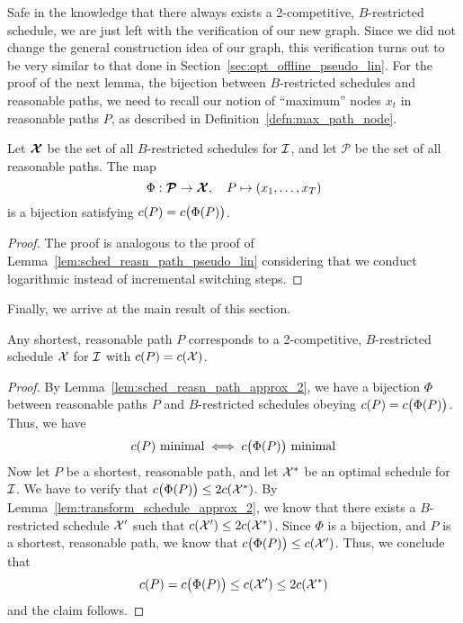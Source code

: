 Safe in the knowledge that there always exists a 2-competitive, $B$-restricted schedule, we are just left with the verification of our new graph. Since we did not change the general construction idea of our graph, this verification turns out to be very similar to that done in Section~\ref{sec:opt_offline_pseudo_lin}. For the proof of the next lemma, the bijection between $B$-restricted schedules and reasonable paths, we need to recall our notion of ``maximum'' nodes $x_t$ in reasonable paths $P$, as described in Definition~\ref{defn:max_path_node}.
\begin{lem}\label{lem:sched_reasn_path_approx_2}
Let $\bm{\mathcal{X}}$ be the set of all $B$-restricted schedules for $\mathcal{I}$, and let $\bm{\mathcal{P}}$ be the set of all reasonable paths. The map
\begin{equation*}
	\Phi:\bm{\mathcal{P}}\rightarrow\bm{\mathcal{X}},\quad P\mapsto (x_1,\dotsc,x_T)
\end{equation*}
is a bijection satisfying $c(P)=c\bigl(\Phi(P)\bigr)$.
\end{lem}
\begin{proof}
The proof is analogous to the proof of Lemma~\ref{lem:sched_reasn_path_pseudo_lin} considering that we conduct logarithmic instead of incremental switching steps.
\end{proof}
Finally, we arrive at the main result of this section.
\begin{thm}\label{thm:approx_2}
Any shortest, reasonable path $P$ corresponds to a 2-competitive, $B$-restricted schedule $\mathcal{X}$ for $\mathcal{I}$ with $c(P)=c(\mathcal{X})$.
\end{thm} 
\begin{proof}
By Lemma~\ref{lem:sched_reasn_path_approx_2}, we have a bijection $\Phi$ between reasonable paths $P$ and $B$-restricted schedules obeying $c(P)=c\bigl(\Phi(P)\bigr)$. Thus, we have 
\begin{equation*}
	c(P)\text{ minimal}\iff c\bigl(\Phi(P)\big)\text{ minimal}
\end{equation*}
Now let $P$ be a shortest, reasonable path, and let $\mathcal{X}^*$ be an optimal schedule for $\mathcal{I}$. We have to verify that $c\bigl(\Phi(P)\bigr)\le 2c(\mathcal{X}^*)$. By Lemma~\ref{lem:transform_schedule_approx_2}, we know that there exists a $B$-restricted schedule $\mathcal{X}'$ such that $c(\mathcal{X}')\le 2c(\mathcal{X}^*)$. Since $\Phi$ is a bijection, and $P$ is a shortest, reasonable path, we know that $c\bigl(\Phi(P)\bigr)\le c(\mathcal{X}')$. Thus, we conclude that 
\begin{equation*}
	c(P)=c\bigl(\Phi(P)\bigr)\le c(\mathcal{X}')\le 2c(\mathcal{X}^*)
\end{equation*}
and the claim follows.
\end{proof}
